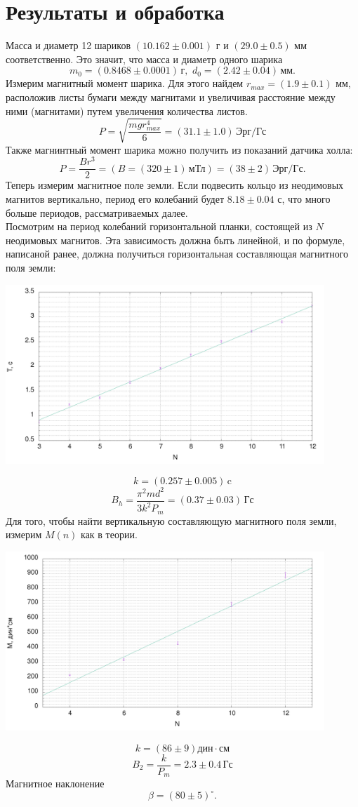 \section*{Результаты и обработка}
Масса и диаметр 12 шариков $(10.162\pm0.001)$ г и $(29.0\pm0.5)$ мм соответственно. Это значит, что масса и диаметр одного шарика
$$m_0 = (0.8468\pm0.0001)\,\text{г},\,\,d_0 = (2.42\pm0.04)\,\text{мм}.$$
Измерим магнитный момент шарика. Для этого найдем $r_{max}=(1.9\pm0.1)$ мм, расположив листы бумаги между магнитами и увеличивая расстояние между ними (магнитами) путем увеличения количества листов.
$$P = \sqrt{\frac{mgr_{max}^4}{6}} = (31.1\pm1.0)\,\text{Эрг}/\text{Гс}$$
Также магнинтный момент шарика можно получить из показаний датчика холла:
$$P = \frac{Br^3}{2} = (B=(320\pm1)\,\text{мТл}) = (38\pm2)\,\text{Эрг}/\text{Гс}.$$
Теперь измерим магнитное поле земли. Если подвесить кольцо из неодимовых магнитов вертикально, период его колебаний будет $8.18\pm0.04$ с, что много больше периодов, рассматриваемых далее.\\
Посмотрим на период колебаний горизонтальной планки, состоящей из $N$ неодимовых магнитов. Эта зависимость должна быть линейной, и по формуле, написаной ранее, должна получиться горизонтальная составляющая магнитного поля земли:
\begin{center}
\includegraphics[width=0.90\textwidth]{plot0.png}
\end{center}
$$k = (0.257\pm0.005)\,\text{c}$$
$$B_h = \dfrac{\pi^2 m d^2}{3k^2P_m} = (0.37\pm0.03)\,\text{Гс}$$
Для того, чтобы найти вертикальную составляющую магнитного поля земли, измерим $M(n)$ как в теории.
\begin{center}
\includegraphics[width=0.90\textwidth]{plot1.png}
\end{center}
$$k = (86\pm9)\text{дин}\cdot\text{см}$$
$$B_2 = \frac{k}{P_m} = 2.3\pm0.4 \,\text{Гс}$$
Магнитное наклонение
$$\beta = (80\pm5)^\circ.$$

